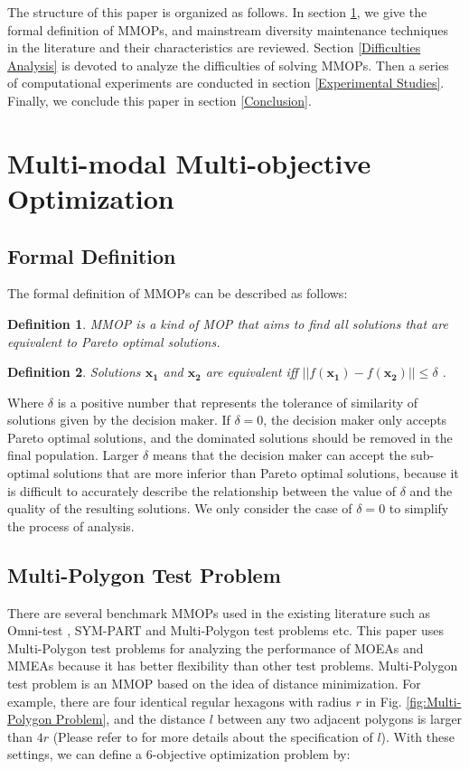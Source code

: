 \documentclass[conference]{IEEEtran}
\newtheorem{definition}{Definition}
\begin{document}
The structure of this paper is organized as follows. In section \ref{Multi-modal Multi-objective Optimization}, we give the formal definition of MMOPs, and mainstream diversity maintenance techniques in the literature and their characteristics are reviewed. Section \ref{Difficulties Analysis} is devoted to analyze the difficulties of solving MMOPs. Then a series of computational experiments are conducted in section \ref{Experimental Studies}. Finally, we conclude this paper in section \ref{Conclusion}.
\section{Multi-modal Multi-objective Optimization}
\label{Multi-modal Multi-objective Optimization}
\subsection{Formal Definition}
The formal definition of MMOPs can be described as follows\cite{Tanabe2019}:
\begin{definition}
MMOP is a kind of MOP that aims to find all solutions that are equivalent to Pareto optimal solutions. 
\end{definition}
\begin{definition}
Solutions $\boldsymbol{x_1}$ and  $\boldsymbol{x_2}$ are equivalent  iff $||f(\boldsymbol{x_1}) - f(\boldsymbol{x_2})|| \leq \delta$ .
\end{definition}
Where $\delta$ is a positive number that represents the tolerance of similarity of solutions given by the decision maker. If $\delta = 0$, the decision maker only accepts Pareto optimal solutions, and the dominated solutions should be removed in the final population.  Larger $\delta$ means that the decision maker can accept the sub-optimal solutions that are more inferior than Pareto optimal solutions, because it is difficult to accurately describe the relationship between the value of $\delta$ and the quality of the resulting solutions. We only consider the case of $\delta =0$ to simplify the process of analysis. 

\subsection{Multi-Polygon Test Problem}
There are several benchmark MMOPs used in the existing literature such as Omni-test \cite{Deb2005} , SYM-PART \cite{Rudolph2007a} and Multi-Polygon\cite{Hisao} test problems etc. This paper uses Multi-Polygon test problems for analyzing the performance of MOEAs and MMEAs because it has better flexibility than other test problems. Multi-Polygon test problem is an MMOP based on the idea of distance minimization. For example, there are four identical regular hexagons with radius $r$ in Fig. \ref{fig:Multi-Polygon Problem}, and the distance $l$ between any two adjacent polygons is larger than $4r$ (Please refer to \cite{Hisao} for more details about the specification of $l$). With these settings, we can define a 6-objective optimization problem by:
\end{document}
